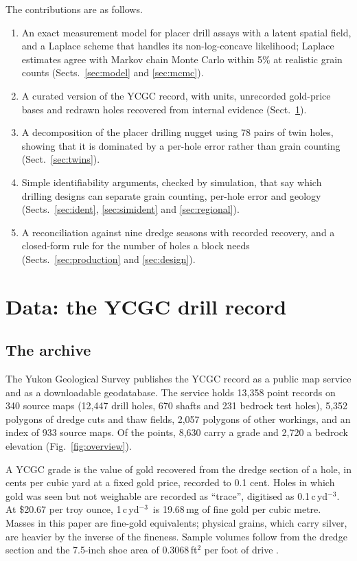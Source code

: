\documentclass[11pt,a4paper]{article}
\theoremstyle{remark}
\newcommand{\cyd}{c\,yd$^{-3}$}
\begin{document}
The contributions are as follows.
\begin{enumerate}
  \item An exact measurement model for placer drill assays with a latent spatial field, and a Laplace scheme that handles its non-log-concave likelihood; Laplace estimates agree with Markov chain Monte Carlo within 5\% at realistic grain counts (Sects.~\ref{sec:model} and \ref{sec:mcmc}).
  \item A curated version of the YCGC record, with units, unrecorded gold-price bases and redrawn holes recovered from internal evidence (Sect.~\ref{sec:data}).
  \item A decomposition of the placer drilling nugget using 78 pairs of twin holes, showing that it is dominated by a per-hole error rather than grain counting (Sect.~\ref{sec:twins}).
  \item Simple identifiability arguments, checked by simulation, that say which drilling designs can separate grain counting, per-hole error and geology (Sects.~\ref{sec:ident}, \ref{sec:simident} and \ref{sec:regional}).
  \item A reconciliation against nine dredge seasons with recorded recovery, and a closed-form rule for the number of holes a block needs (Sects.~\ref{sec:production} and \ref{sec:design}).
\end{enumerate}

\section{Data: the YCGC drill record}\label{sec:data}

\subsection{The archive}

The Yukon Geological Survey publishes the YCGC record as a public map service \citep{YGS2020} and as a downloadable geodatabase. The service holds 13,358 point records on 340 source maps (12,447 drill holes, 670 shafts and 231 bedrock test holes), 5,352 polygons of dredge cuts and thaw fields, 2,057 polygons of other workings, and an index of 933 source maps. Of the points, 8,630 carry a grade and 2,720 a bedrock elevation (Fig.~\ref{fig:overview}).

A YCGC grade is the value of gold recovered from the dredge section of a hole, in cents per cubic yard at a fixed gold price, recorded to 0.1 cent. Holes in which gold was seen but not weighable are recorded as ``trace'', digitised as 0.1\,\cyd. At \$20.67 per troy ounce, 1\,\cyd\ is 19.68\,mg of fine gold per cubic metre. Masses in this paper are fine-gold equivalents; physical grains, which carry silver, are heavier by the inverse of the fineness. Sample volumes follow from the dredge section and the 7.5-inch shoe area of 0.3068\,ft$^2$ per foot of drive \citep{Wells1969}.
\end{document}
